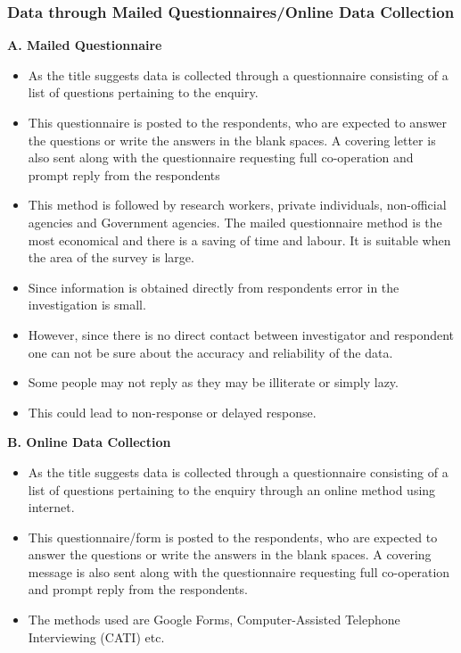 \documentclass[
10pt, %
a4paper, %
]{report}
\begin{document}
\subsubsection*{Data through Mailed Questionnaires/Online Data Collection}
\textbf{A. Mailed Questionnaire}
\begin{itemize}
\item As the title suggests data is collected through a questionnaire consisting of a list of questions pertaining to the enquiry.
\item This questionnaire is posted to the respondents, who are expected to answer the questions or write the answers in the blank spaces. A covering letter is also sent along with the questionnaire requesting full co-operation and prompt reply from the respondents
\item This method is followed by research workers, private individuals, non-official agencies and Government agencies. The mailed questionnaire method is the most economical and there is a saving of time and labour. It is suitable when the area of the  survey is large.
\item Since information is obtained directly from respondents error in the investigation is small.
\item However, since there is no direct contact between investigator and respondent one can not be sure about the accuracy and reliability of the data.
\item Some people may not reply as they may be illiterate or simply lazy.
\item This could lead to non-response or delayed response.
\end{itemize}
\textbf{B. Online Data Collection}
\begin{itemize}
\item As the title suggests data is collected through a questionnaire consisting of a list of questions pertaining to the enquiry through an online method using internet.
\item This questionnaire/form is posted to the respondents, who are expected to answer the questions or write the answers in the blank spaces. A covering message is also sent along with the questionnaire requesting full co-operation and prompt reply from the respondents.
\item The methods used are Google Forms, Computer-Assisted Telephone Interviewing (CATI) etc.
\end{itemize}
\end{document}
